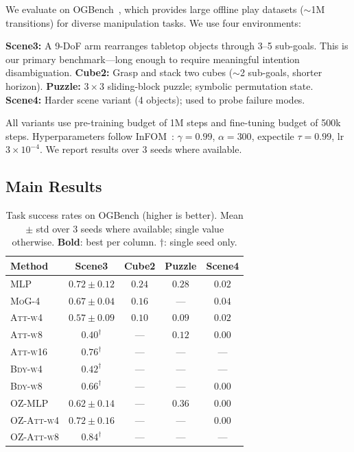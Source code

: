 \documentclass{article}
\newcommand{\base}{InFOM}
\begin{document}
We evaluate on OGBench~\citep{park2025ogbenchbenchmarkingofflinegoalconditioned}, which provides large
offline play datasets ($\sim$1M transitions) for diverse manipulation tasks.
We use four environments:

\textbf{Scene3:} A 9-DoF arm rearranges tabletop objects through 3--5 sub-goals.
This is our primary benchmark---long enough to require meaningful intention
disambiguation.
\textbf{Cube2:} Grasp and stack two cubes ($\sim$2 sub-goals, shorter horizon).
\textbf{Puzzle:} $3{\times}3$ sliding-block puzzle; symbolic permutation state.
\textbf{Scene4:} Harder scene variant (4 objects); used to probe failure modes.

All variants use pre-training budget of 1M steps and fine-tuning budget of
500k steps.
Hyperparameters follow \base{}~\citep{zheng2025infom}: $\gamma=0.99$,
$\alpha=300$, expectile $\tau=0.99$, lr $3{\times}10^{-4}$.
We report results over 3 seeds where available.

\subsection{Main Results}

\begin{table}[t]
\centering
\caption{Task success rates on OGBench (higher is better).
Mean $\pm$ std over 3 seeds where available; single value otherwise.
\textbf{Bold}: best per column.
$\dagger$: single seed only.}
\label{tab:main}
\setlength{\tabcolsep}{5pt}
\begin{tabular}{lcccc}
\toprule
\textbf{Method} & \textbf{Scene3} & \textbf{Cube2} & \textbf{Puzzle} & \textbf{Scene4} \\
\midrule
\textsc{MLP}        & $0.72 \pm 0.12$ & $\mathbf{0.24}$ & $\mathbf{0.28}$ & $0.02$ \\
\textsc{MoG-4}      & $0.67 \pm 0.04$ & $0.16$          & ---             & $0.04$ \\
\textsc{Att-w4}     & $0.57 \pm 0.09$ & $0.10$          & $0.09$          & $0.02$ \\
\textsc{Att-w8}     & $0.40^\dagger$  & ---             & $0.12$          & $0.00$ \\
\textsc{Att-w16}    & $0.76^\dagger$  & ---             & ---             & ---    \\
\textsc{Bdy-w4}     & $0.42^\dagger$  & ---             & ---             & ---    \\
\textsc{Bdy-w8}     & $0.66^\dagger$  & ---             & ---             & $0.00$ \\
\midrule
\textsc{OZ-MLP}     & $0.62 \pm 0.14$ & ---             & $0.36$          & $0.00$ \\
\textsc{OZ-Att-w4}  & $\mathbf{0.72 \pm 0.16}$ & ---  & ---             & $0.00$ \\
\textsc{OZ-Att-w8}  & $0.84^\dagger$  & ---             & ---             & ---    \\
\bottomrule
\end{tabular}
\end{table}
\end{document}
